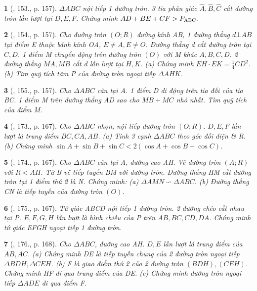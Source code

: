 \documentclass{article}
\newtheorem{baitoan}{}
\begin{document}
\begin{baitoan}[\cite{Tuyen_Toan_9_old}, 153., p. 157]
	$\Delta ABC$ nội tiếp 1 đường tròn. 3 tia phân giác $\widehat{A},\widehat{B},\widehat{C}$ cắt đường tròn lần lượt tại $D,E,F$. Chứng minh $AD + BE + CF > P_{\rm ABC}$.
\end{baitoan}

\begin{baitoan}[\cite{Tuyen_Toan_9_old}, 154., p. 157]
	Cho đường tròn $(O;R)$ đường kính AB, 1 đường thẳng $d\bot AB$ tại điểm E thuộc bánh kính OA, $E\ne A,E\ne O$. Đường thẳng d cắt đường tròn tại $C,D$. 1 điểm M chuyển động trên đường tròn $(O)$ với M khác $A,B,C,D$. 2 đường thẳng $MA,MB$ cắt d lần lượt tại $H,K$. (a) Chứng minh $EH\cdot EK = \frac{1}{4}CD^2$. (b) Tìm quỹ tích tâm P của đường tròn ngoại tiếp $\Delta AHK$.
\end{baitoan}

\begin{baitoan}[\cite{Tuyen_Toan_9_old}, 155., p. 157]
	Cho $\Delta ABC$ cân tại A. 1 điểm D di động trên tia đối của tia BC. 1 điểm M trên đường thẳng AD sao cho $MB + MC$ nhỏ nhất. Tìm quỹ tích của điểm M.
\end{baitoan}

\begin{baitoan}[\cite{Tuyen_Toan_9_old}, 173., p. 167]
	Cho $\Delta ABC$ nhọn, nội tiếp đường tròn $(O;R)$. $D,E,F$ lần lượt là trung điểm $BC,CA,AB$. (a) Tính 3 cạnh $\Delta ABC$ theo góc đối diện \& R. (b) Chứng minh $\sin A + \sin B + \sin C < 2(\cos A + \cos B + \cos C)$.
\end{baitoan}

\begin{baitoan}[\cite{Tuyen_Toan_9_old}, 174., p. 167]
	Cho $\Delta ABC$ cân tại A, đường cao AH. Vẽ đường tròn $(A;R)$ với $R < AH$. Từ B vẽ tiếp tuyến BM với đường tròn. Đường thẳng HM cắt đường tròn tại 1 điểm thứ 2 là N. Chứng minh: (a) $\Delta AMN\backsim\Delta ABC$. (b) Đường thẳng CN là tiếp tuyến của đường tròn $(O)$.
\end{baitoan}

\begin{baitoan}[\cite{Tuyen_Toan_9_old}, 175., p. 167]
	Tứ giác ABCD nội tiếp 1 đường tròn. 2 đường chéo cắt nhau tại P. $E,F,G,H$ lần lượt là hình chiếu của P trên $AB,BC,CD,DA$. Chứng minh tứ giác EFGH ngoại tiếp 1 đường tròn.
\end{baitoan}

\begin{baitoan}[\cite{Tuyen_Toan_9_old}, 176., p. 168]
	Cho $\Delta ABC$, đường cao AH. $D,E$ lần lượt là trung điểm của $AB,AC$. (a) Chứng minh DE là tiếp tuyến chung của 2 đường tròn ngoại tiếp $\Delta BDH,\Delta CEH$. (b) F là giao điểm thứ 2 của 2 đường tròn $(BDH),(CEH)$. Chứng minh HF đi qua trung điểm của DE. (c) Chứng minh đường tròn ngoại tiếp $\Delta ADE$ đi qua điểm F.
\end{baitoan}
\end{document}
